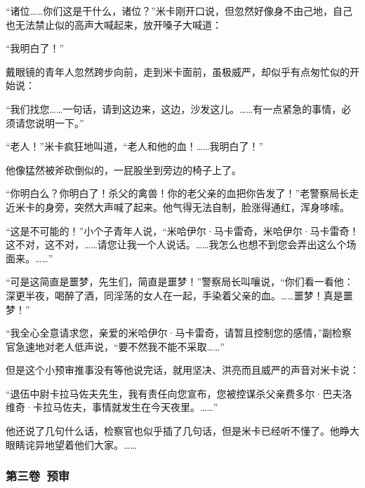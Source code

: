 \par “诸位……你们这是干什么，诸位？”米卡刚开口说，但忽然好像身不由己地，自己也无法禁止似的高声大喊起来，放开嗓子大喊道：
\par “我明白了！”
\par 戴眼镜的青年人忽然跨步向前，走到米卡面前，虽极威严，却似乎有点匆忙似的开始说：
\par “我们找您……一句话，请到这边来，这边，沙发这儿。……有一点紧急的事情，必须请您说明一下。”
\par “老人！”米卡疯狂地叫道，“老人和他的血！……我明白了！”
\par 他像猛然被斧砍倒似的，一屁股坐到旁边的椅子上了。
\par “你明白么？你明白了！杀父的禽兽！你的老父亲的血把你告发了！”老警察局长走近米卡的身旁，突然大声喊了起来。他气得无法自制，脸涨得通红，浑身哆嗦。
\par “这是不可能的！”小个子青年人说，“米哈伊尔·马卡雷奇，米哈伊尔·马卡雷奇！这不对，这不对，……请您让我一个人说话。……我怎么也想不到您会弄出这么个场面来。……”
\par “可是这简直是噩梦，先生们，简直是噩梦！”警察局长叫嚷说，“你们看一看他：深更半夜，喝醉了酒，同淫荡的女人在一起，手染着父亲的血。……噩梦！真是噩梦！”
\par “我全心全意请求您，亲爱的米哈伊尔·马卡雷奇，请暂且控制您的感情，”副检察官急速地对老人低声说，“要不然我不能不采取……”
\par 但是这个小预审推事没有等他说完话，就用坚决、洪亮而且威严的声音对米卡说：
\par “退伍中尉卡拉马佐夫先生，我有责任向您宣布，您被控谋杀父亲费多尔·巴夫洛维奇·卡拉马佐夫，事情就发生在今天夜里。……”
\par 他还说了几句什么话，检察官也似乎插了几句话，但是米卡已经听不懂了。他睁大眼睛诧异地望着他们大家。……












\subsubsection*{第三卷\ 预审}


